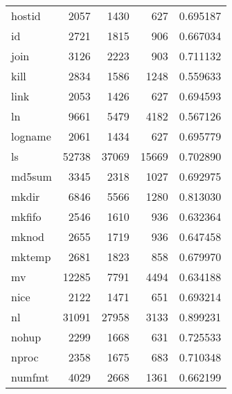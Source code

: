 \begin{longtable}{lrrrr}
hostid    &                     2057 &         1430 &           627 &                 0.695187 \\
id        &                     2721 &         1815 &           906 &                 0.667034 \\
join      &                     3126 &         2223 &           903 &                 0.711132 \\
kill      &                     2834 &         1586 &          1248 &                 0.559633 \\
link      &                     2053 &         1426 &           627 &                 0.694593 \\
ln        &                     9661 &         5479 &          4182 &                 0.567126 \\
logname   &                     2061 &         1434 &           627 &                 0.695779 \\
ls        &                    52738 &        37069 &         15669 &                 0.702890 \\
md5sum    &                     3345 &         2318 &          1027 &                 0.692975 \\
mkdir     &                     6846 &         5566 &          1280 &                 0.813030 \\
mkfifo    &                     2546 &         1610 &           936 &                 0.632364 \\
mknod     &                     2655 &         1719 &           936 &                 0.647458 \\
mktemp    &                     2681 &         1823 &           858 &                 0.679970 \\
mv        &                    12285 &         7791 &          4494 &                 0.634188 \\
nice      &                     2122 &         1471 &           651 &                 0.693214 \\
nl        &                    31091 &        27958 &          3133 &                 0.899231 \\
nohup     &                     2299 &         1668 &           631 &                 0.725533 \\
nproc     &                     2358 &         1675 &           683 &                 0.710348 \\
numfmt    &                     4029 &         2668 &          1361 &                 0.662199 \\

\end{longtable}
